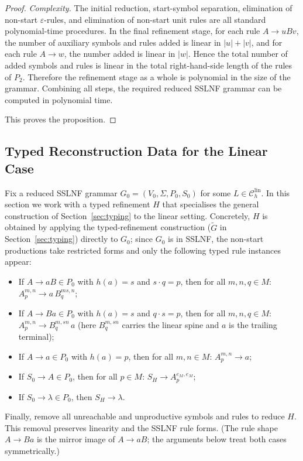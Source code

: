 \documentclass[11pt,a4paper]{article}
\newcommand{\lin}{\mathrm{lin}}
\newcommand{\Clin}[1]{\mathcal C_{#1}^{\lin}}
\begin{document}
\begin{proof}
\smallskip\noindent\emph{Complexity.}
The initial reduction, start-symbol separation, elimination of non-start $\varepsilon$-rules, and elimination of non-start unit rules are all standard polynomial-time procedures. In the final refinement stage, for each rule $A\to uBv$, the number of auxiliary symbols and rules added is linear in $|u|+|v|$, and for each rule $A\to w$, the number added is linear in $|w|$. Hence the total number of added symbols and rules is linear in the total right-hand-side length of the rules of $P_2$. Therefore the refinement stage as a whole is polynomial in the size of the grammar. Combining all steps, the required reduced SSLNF grammar can be computed in polynomial time.

This proves the proposition.
\end{proof}
\subsection{Typed Reconstruction Data for the Linear Case}
\label{subsec:linear-typed}

Fix a reduced SSLNF grammar $G_0=(V_0,\Sigma,P_0,S_0)$ for some $L\in\Clin{h}$.
In this section we work with a typed refinement $H$ that specialises the general
construction of Section~\ref{sec:typing} to the linear setting.
Concretely, $H$ is obtained by applying the typed-refinement construction
($\widetilde G$ in Section~\ref{sec:typing}) directly to $G_0$;
since $G_0$ is in SSLNF, the non-start productions take restricted forms
and only the following typed rule instances appear:

\begin{itemize}[nosep,leftmargin=2.2em]
  \item If $A\to aB\in P_0$ with $h(a)=s$ and $s\cdot q=p$, then for all $m,n,q\in M$:
        $A_p^{m,n}\to a\,B_q^{ms,n}$;
  \item If $A\to Ba\in P_0$ with $h(a)=s$ and $q\cdot s=p$, then for all $m,n,q\in M$:
        $A_p^{m,n}\to B_q^{m,sn}\,a$
        (here $B_q^{m,sn}$ carries the linear spine and $a$ is the trailing terminal);
  \item If $A\to a\in P_0$ with $h(a)=p$, then for all $m,n\in M$:
        $A_p^{m,n}\to a$;
  \item If $S_0\to A\in P_0$, then for all $p\in M$: $S_H\to A_p^{e_M,e_M}$;
  \item If $S_0\to\lambda\in P_0$, then $S_H\to\lambda$.
\end{itemize}

Finally, remove all unreachable and unproductive symbols and rules to reduce $H$.
This removal preserves linearity and the SSLNF rule forms.
(The rule shape $A\to Ba$ is the mirror image of $A\to aB$;
the arguments below treat both cases symmetrically.)
\end{document}
